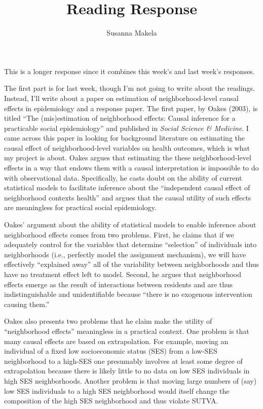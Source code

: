 \documentclass[10pt,a4paper]{article}
\author{Susanna Makela}
\title{Reading Response}
\begin{document}
\maketitle

This is a longer response since it combines this week's and last week's responses.

The first part is for last week, though I'm not going to write about the readings. Instead, I'll write about a paper on estimation of neighborhood-level causal effects in epidemiology and a response paper. The first paper, by Oakes (2003), is titled ``The (mis)estimation of neighborhood effects: Causal inference for a practicable social epidemiology'' and published in \textit{Social Science \& Medicine}. I came across this paper in looking for background literature on estimating the causal effect of neighborhood-level variables on health outcomes, which is what my project is about. Oakes argues that estimating the these neighborhood-level effects in a way that endows them with a causal interpretation is impossible to do with observational data. Specifically, he casts doubt on the ability of current statistical models to facilitate inference about the ``independent causal effect of neighborhood contexts health'' and argues that the causal utility of such effects are meaningless for practical social epidemiology.

Oakes' argument about the ability of statistical models to enable inference about neighborhood effects comes from two problems. First, he claims that if we adequately control for the variables that determine ``selection'' of individuals into neighborhoods (i.e., perfectly model the assignment mechanism), we will have effectively ``explained away'' all of the variability between neighborhoods and thus have no treatment effect left to model. Second, he argues that neighborhood effects emerge as the result of interactions between residents and are thus indistinguishable and unidentifiable because ``there is no exogenous intervention causing them.''

Oakes also presents two problems that he claim make the utility of ``neighborhood effects'' meaningless in a practical context. One problem is that many causal effects are based on extrapolation. For example, moving an individual of a fixed low socioeconomic status (SES) from a low-SES neighborhood to a high-SES one presumably involves at least some degree of extrapolation because there is likely little to no data on low SES individuals in high SES neighborhoods. Another problem is that moving large numbers of (say) low SES individuals to a high SES neighborhood would itself change the composition of the high SES neighborhood and thus violate SUTVA.
\end{document}
